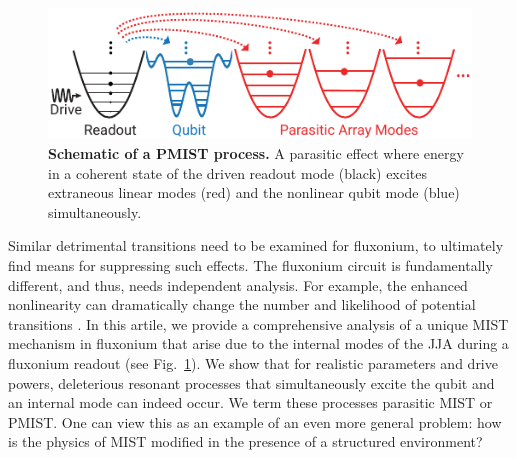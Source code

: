 \documentclass[%
reprint,
superscriptaddress,
 amsmath,amssymb,
 aps,
 prx,
longbibliography,
floatfix,
]{revtex4-2}
\begin{document}
\begin{figure}
    \centering
    \includegraphics[width=\linewidth]{Figures/Demo.pdf}
    \caption{{\bf Schematic of a PMIST process.} A parasitic effect where energy in a coherent state of the driven readout mode (black) excites extraneous linear modes (red) and the nonlinear qubit mode (blue) simultaneously. 
    }
    \label{fig:demo}
\end{figure}


Similar detrimental transitions need to be examined for fluxonium, to ultimately find means for suppressing such effects. The fluxonium circuit is fundamentally different, and thus, needs independent analysis. %
For example, the enhanced nonlinearity can dramatically change the number and likelihood of potential transitions \cite{nesterov2024measurement,xiao2023diagrammatic}. In this artile, we provide a comprehensive analysis of a unique MIST mechanism in fluxonium that arise due to the internal modes of the JJA during a fluxonium readout (see Fig.~\ref{fig:demo}). We show that for realistic parameters and drive powers, deleterious resonant processes that simultaneously excite the qubit and an internal mode can indeed occur. We term these processes parasitic MIST or PMIST.  One can view this as an example of an even more general problem: how is the physics of MIST modified in the presence of a structured environment?  
\end{document}
